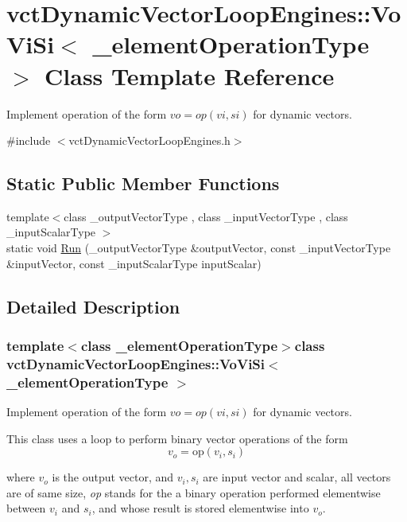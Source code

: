 \hypertarget{classvct_dynamic_vector_loop_engines_1_1_vo_vi_si}{}\section{vct\+Dynamic\+Vector\+Loop\+Engines\+:\+:Vo\+Vi\+Si$<$ \+\_\+element\+Operation\+Type $>$ Class Template Reference}
\label{classvct_dynamic_vector_loop_engines_1_1_vo_vi_si}


Implement operation of the form $vo = op(vi, si)$ for dynamic vectors.  




{\ttfamily \#include $<$vct\+Dynamic\+Vector\+Loop\+Engines.\+h$>$}

\subsection*{Static Public Member Functions}
\begin{DoxyCompactItemize}
\item 
{\footnotesize template$<$class \+\_\+output\+Vector\+Type , class \+\_\+input\+Vector\+Type , class \+\_\+input\+Scalar\+Type $>$ }\\static void \hyperlink{classvct_dynamic_vector_loop_engines_1_1_vo_vi_si_abcae46b3652d4090c5157d58e70b256a}{Run} (\+\_\+output\+Vector\+Type \&output\+Vector, const \+\_\+input\+Vector\+Type \&input\+Vector, const \+\_\+input\+Scalar\+Type input\+Scalar)
\end{DoxyCompactItemize}


\subsection{Detailed Description}
\subsubsection*{template$<$class \+\_\+element\+Operation\+Type$>$class vct\+Dynamic\+Vector\+Loop\+Engines\+::\+Vo\+Vi\+Si$<$ \+\_\+element\+Operation\+Type $>$}

Implement operation of the form $vo = op(vi, si)$ for dynamic vectors. 

This class uses a loop to perform binary vector operations of the form \[ v_o = \mathrm{op}(v_i, s_i) \]

where $v_o$ is the output vector, and $v_i, s_i$ are input vector and scalar, all vectors are of same size, {\itshape op} stands for the a binary operation performed elementwise between $v_i$ and $s_i$, and whose result is stored elementwise into $v_o$.


